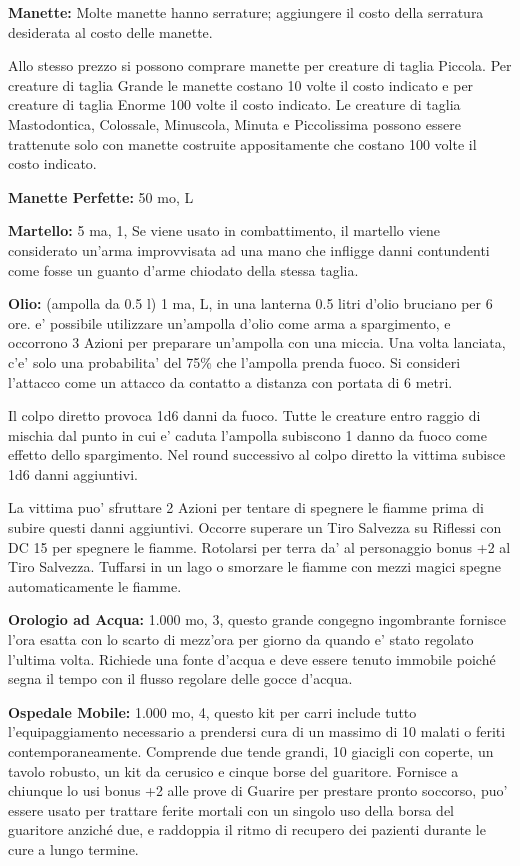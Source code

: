 \documentclass[a4paper,11pt,twoside,openany]{book}
\begin{document}
{\textbf{Manette:} Molte manette hanno serrature; aggiungere il costo della serratura desiderata al costo delle manette.

Allo stesso prezzo si possono comprare manette per creature di taglia Piccola. Per creature di taglia Grande le manette costano 10 volte il costo indicato e per creature di taglia Enorme 100 volte il costo indicato. Le creature di taglia Mastodontica, Colossale, Minuscola, Minuta e Piccolissima possono essere trattenute solo con manette costruite appositamente che costano 100 volte il costo indicato.

\textbf{Manette Perfette:} 50 mo, L

\textbf{Martello:} 5 ma, 1, Se viene usato in combattimento, il martello viene considerato un'arma improvvisata ad una mano che infligge danni contundenti come fosse un guanto d'arme chiodato della stessa taglia.

\textbf{Olio:} (ampolla da 0.5 l) 1 ma, L, in una lanterna 0.5 litri d'olio bruciano per 6 ore. e' possibile utilizzare un'ampolla d'olio come arma a spargimento, e occorrono 3 Azioni per preparare un'ampolla con una miccia. Una volta lanciata, c'e' solo una probabilita' del 75\% che l'ampolla prenda fuoco. Si consideri l'attacco come un attacco da contatto a distanza con portata di 6 metri.

Il colpo diretto provoca 1d6 danni da fuoco. Tutte le creature entro raggio di mischia dal punto in cui e' caduta l'ampolla subiscono 1 danno da fuoco come effetto dello spargimento. Nel round successivo al colpo diretto la vittima subisce 1d6 danni aggiuntivi.

La vittima puo' sfruttare 2 Azioni per tentare di spegnere le fiamme prima di subire questi danni aggiuntivi. Occorre superare un Tiro Salvezza su Riflessi con DC 15 per spegnere le fiamme. Rotolarsi per terra da' al personaggio bonus +2 al Tiro Salvezza. 
Tuffarsi in un lago o smorzare le fiamme con mezzi magici spegne automaticamente le fiamme.

\textbf{Orologio ad Acqua:} 1.000 mo, 3, questo grande congegno ingombrante fornisce l'ora esatta con lo scarto di mezz'ora per giorno da quando e' stato regolato l'ultima volta. Richiede una fonte d'acqua e deve essere tenuto immobile poiché segna il tempo con il flusso regolare delle gocce d'acqua.

\textbf{Ospedale Mobile:} 1.000 mo, 4, questo kit per carri include tutto l'equipaggiamento necessario a prendersi cura di un massimo di 10 malati o feriti contemporaneamente. Comprende due tende grandi, 10 giacigli con coperte, un tavolo robusto, un kit da cerusico e cinque borse del guaritore. Fornisce a chiunque lo usi bonus +2 alle prove di Guarire per prestare pronto soccorso, puo' essere usato per trattare ferite mortali con un singolo uso della borsa del guaritore anziché due, e raddoppia il ritmo di recupero dei pazienti durante le cure a lungo termine.

}
\end{document}
